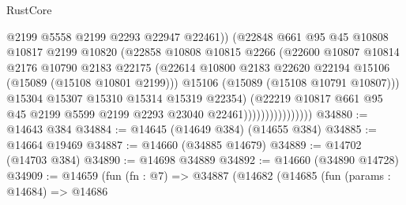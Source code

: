 \begin{lexlean}{RustCore}
\begin{coremodule}
                                    @2199
                                    @5558
                                    @2199
                                    @2293
                                    @22947
                                    @22461))
                                (@22848
                                  @661
                                  @95
                                  @45
                                  @10808
                                  @10817
                                  @2199
                                  @10820
                                  (@22858
                                    @10808
                                    @10815
                                    @2266
                                    (@22600
                                      @10807
                                      @10814
                                      @2176
                                      @10790
                                      @2183
                                      @22175
                                      (@22614
                                        @10800
                                        @2183
                                        @22620
                                        @22194
                                        @15106
                                        (@15089 (@15108 @10801 @2199)))
                                      @15106
                                      (@15089 (@15108 @10791 @10807)))
                                    @15304
                                    @15307
                                    @15310
                                    @15314
                                    @15319
                                    @22354)
                                  (@22219
                                    @10817
                                    @661
                                    @95
                                    @45
                                    @2199
                                    @5599
                                    @2199
                                    @2293
                                    @23040
                                    @22461))))))))))))))))
@34880 := @14643 @384
@34884 := @14645 (@14649 @384) (@14655 @384)
@34885 := @14664 @19469
@34887 := @14660 (@34885 @14679)
@34889 := @14702 (@14703 @384)
@34890 := @14698 @34889
@34892 := @14660 (@34890 @14728)
@34909 := @14659
    (fun (fn : @7) =>
    @34887
      (@14682
        (@14685
          (fun (params : @14684) =>
          @14686

\end{coremodule}
\end{lexlean}
